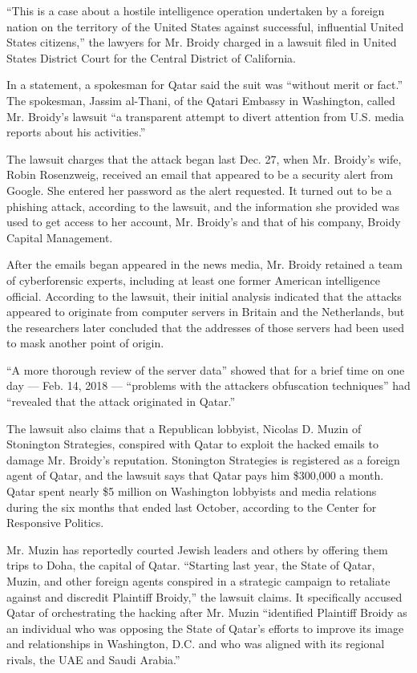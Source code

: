 ``This is a case about a hostile intelligence operation undertaken by a
foreign nation on the territory of the United States against successful,
influential United States citizens,'' the lawyers for Mr. Broidy charged
in a lawsuit filed in United States District Court for the Central
District of California.

In a statement, a spokesman for Qatar said the suit was ``without merit
or fact.'' The spokesman, Jassim al-Thani, of the Qatari Embassy in
Washington, called Mr. Broidy's lawsuit ``a transparent attempt to
divert attention from U.S. media reports about his activities.''

The lawsuit charges that the attack began last Dec. 27, when Mr.
Broidy's wife, Robin Rosenzweig, received an email that appeared to be a
security alert from Google. She entered her password as the alert
requested. It turned out to be a phishing attack, according to the
lawsuit, and the information she provided was used to get access to her
account, Mr. Broidy's and that of his company, Broidy Capital
Management.

After the emails began appeared in the news media, Mr. Broidy retained a
team of cyberforensic experts, including at least one former American
intelligence official. According to the lawsuit, their initial analysis
indicated that the attacks appeared to originate from computer servers
in Britain and the Netherlands, but the researchers later concluded that
the addresses of those servers had been used to mask another point of
origin.

``A more thorough review of the server data'' showed that for a brief
time on one day --- Feb. 14, 2018 --- ``problems with the attackers
obfuscation techniques'' had ``revealed that the attack originated in
Qatar.''

The lawsuit also claims that a Republican lobbyist, Nicolas D. Muzin of
Stonington Strategies, conspired with Qatar to exploit the hacked emails
to damage Mr. Broidy's reputation. Stonington Strategies is registered
as a foreign agent of Qatar, and the lawsuit says that Qatar pays him
\$300,000 a month. Qatar spent nearly \$5 million on Washington
lobbyists and media relations during the six months that ended last
October, according to the Center for Responsive Politics.

Mr. Muzin has reportedly courted Jewish leaders and others by offering
them trips to Doha, the capital of Qatar. ``Starting last year, the
State of Qatar, Muzin, and other foreign agents conspired in a strategic
campaign to retaliate against and discredit Plaintiff Broidy,'' the
lawsuit claims. It specifically accused Qatar of orchestrating the
hacking after Mr. Muzin ``identified Plaintiff Broidy as an individual
who was opposing the State of Qatar's efforts to improve its image and
relationships in Washington, D.C. and who was aligned with its regional
rivals, the UAE and Saudi Arabia.''

